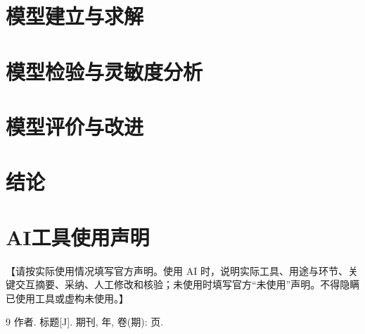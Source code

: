 \documentclass[12pt]{ctexart}
\begin{document}
\section{模型建立与求解}    %
\section{模型检验与灵敏度分析}  %
\section{模型评价与改进}        %
\section{结论}                  %

\section*{AI工具使用声明}
【请按实际使用情况填写官方声明。使用 AI 时，说明实际工具、用途与环节、关键交互摘要、采纳、人工修改和核验；未使用时填写官方“未使用”声明。不得隐瞒已使用工具或虚构未使用。】

\clearpage
\begin{thebibliography}{9}
 作者. 标题[J]. 期刊, 年, 卷(期): 页.
\end{thebibliography}
\end{document}
